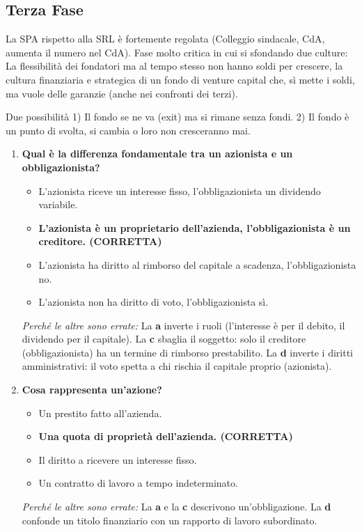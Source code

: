 \documentclass[a4paper,12pt]{article}
\begin{document}
	\subsection{Terza Fase}
	La SPA rispetto alla SRL è fortemente regolata (Colleggio sindacale, CdA, aumenta il numero nel CdA). Fase molto critica in cui si sfondando due culture: La flessibilità dei fondatori ma al tempo stesso non hanno soldi per crescere, la cultura finanziaria e strategica di un fondo di venture capital che, sì mette i soldi, ma vuole delle garanzie (anche nei confronti dei terzi).
	
	Due possibilità 1) Il fondo se ne va (exit) ma si rimane senza fondi. 2) Il fondo è un punto di svolta, si cambia o loro non cresceranno mai.
	
	\begin{enumerate}
		
		\item \textbf{Qual è la differenza fondamentale tra un azionista e un obbligazionista?}
		\begin{itemize}
			\item[a)] L'azionista riceve un interesse fisso, l'obbligazionista un dividendo variabile.
			\item[b)] \textbf{L'azionista è un proprietario dell'azienda, l'obbligazionista è un creditore. (CORRETTA)}
			\item[c)] L'azionista ha diritto al rimborso del capitale a scadenza, l'obbligazionista no.
			\item[d)] L'azionista non ha diritto di voto, l'obbligazionista sì.
		\end{itemize}
		\textit{Perché le altre sono errate:} La \textbf{a} inverte i ruoli (l'interesse è per il debito, il dividendo per il capitale). La \textbf{c} sbaglia il soggetto: solo il creditore (obbligazionista) ha un termine di rimborso prestabilito. La \textbf{d} inverte i diritti amministrativi: il voto spetta a chi rischia il capitale proprio (azionista).
		
		\item \textbf{Cosa rappresenta un'azione?}
		\begin{itemize}
			\item[a)] Un prestito fatto all'azienda.
			\item[b)] \textbf{Una quota di proprietà dell'azienda. (CORRETTA)}
			\item[c)] Il diritto a ricevere un interesse fisso.
			\item[d)] Un contratto di lavoro a tempo indeterminato.
		\end{itemize}
		\textit{Perché le altre sono errate:} La \textbf{a} e la \textbf{c} descrivono un'obbligazione. La \textbf{d} confonde un titolo finanziario con un rapporto di lavoro subordinato.
		

\end{enumerate}
\end{document}
